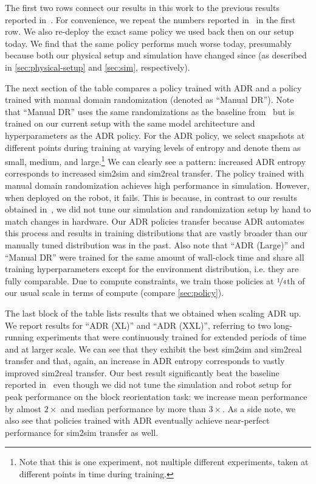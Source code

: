 The first two rows connect our results in this work to the previous results reported in~\cite{openai2018learning}. For convenience, we repeat the numbers reported in~\cite{openai2018learning} in the first row. We also re-deploy the exact same policy we used back then on our setup today. We find that the same policy performs much worse today, presumably because both our physical setup and simulation have changed since (as described in \autoref{sec:physical-setup} and \autoref{sec:sim}, respectively).

The next section of the table compares a policy trained with ADR and a policy trained with manual domain randomization (denoted as ``Manual DR''). Note that ``Manual DR'' uses the same randomizations as the baseline from~\cite{openai2018learning} but is trained on our current setup with the same model architecture and hyperparameters as the ADR policy. For the ADR policy, we select snapshots at different points during training at varying levels of entropy and denote them as small, medium, and large.\footnote{Note that this is one experiment, not multiple different experiments, taken at different points in time during training.} We can clearly see a pattern: increased ADR entropy corresponds to increased sim2sim and sim2real transfer. The policy trained with manual domain randomization achieves high performance in simulation. However, when deployed on the robot, it fails. This is because, in contrast to our results obtained in~\cite{openai2018learning}, we did not tune our simulation and randomization setup by hand to match changes in hardware. Our ADR policies transfer because ADR automates this process and results in training distributions that are vastly broader than our manually tuned distribution was in the past. Also note that ``ADR (Large)'' and ``Manual DR'' were trained for the same amount of wall-clock time and share all training hyperparameters except for the environment distribution, i.e. they are fully comparable. Due to compute constraints, we train those policies at $\nicefrac{1}{4}$th of our usual scale in terms of compute (compare \autoref{sec:policy}).

The last block of the table lists results that we obtained when scaling ADR up. We report results for ``ADR (XL)'' and ``ADR (XXL)'', referring to two long-running experiments that were continuously trained for extended periods of time and at larger scale. We can see that they exhibit the best sim2sim and sim2real transfer and that, again, an increase in ADR entropy corresponds to vastly improved sim2real transfer. Our best result significantly beat the baseline reported in~\cite{openai2018learning} even though we did not tune the simulation and robot setup for peak performance on the block reorientation task: we increase mean performance by almost $2\times$ and median performance by more than $3\times$. As a side note, we also see that policies trained with ADR eventually achieve near-perfect performance for sim2sim transfer as well.

